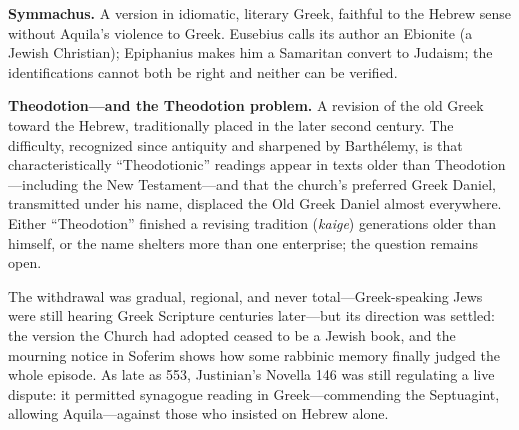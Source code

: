 \textbf{Symmachus.} A version in idiomatic, literary Greek, faithful to
the Hebrew sense without Aquila's violence to Greek. Eusebius calls its
author an Ebionite (a Jewish Christian); Epiphanius makes him a Samaritan
convert to Judaism; the identifications cannot both be right and neither
can be verified.

\textbf{Theodotion---and the Theodotion problem.} A revision of the old
Greek toward the Hebrew, traditionally placed in the later second century.
The difficulty, recognized since antiquity and sharpened by Barth\'elemy,
is that characteristically ``Theodotionic'' readings appear in texts
older than Theodotion---including the New Testament---and that the
church's preferred Greek Daniel, transmitted under his name, displaced the
Old Greek Daniel almost everywhere. Either ``Theodotion'' finished a
revising tradition (\textit{kaige}) generations older than himself, or
the name shelters more than one enterprise; the question remains
open.

The withdrawal was gradual, regional, and never total---Greek-speaking
Jews were still hearing Greek Scripture centuries later---but its
direction was settled: the version the Church had adopted ceased to be a
Jewish book, and the mourning notice in Soferim shows how some rabbinic
memory finally judged the whole episode. As late as 553, Justinian's
Novella 146 was still regulating a live dispute: it permitted synagogue
reading in Greek---commending the Septuagint, allowing Aquila---against
those who insisted on Hebrew alone.
